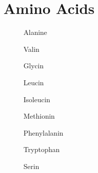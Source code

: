 \chapter{Amino Acids}
\label{sec:appA}

\begin{figure}[ht]
\centering
\begin{minipage}[b]{0.29\linewidth}
\centering
\alanine
\caption{Alanine}
\end{minipage}
\hspace{0.5cm}
\begin{minipage}[b]{0.29\linewidth}
\centering
\valin
\caption{Valin}
\end{minipage}
\hspace{0.5cm}
\begin{minipage}[b]{0.29\linewidth}
\centering
\glycin
\caption{Glycin}
\end{minipage}
\end{figure}


\begin{figure}[ht]
\centering
\begin{minipage}[b]{0.29\linewidth}
\centering
\leucin
\caption{Leucin}
\end{minipage}
\hspace{0.5cm}
\begin{minipage}[b]{0.29\linewidth}
\centering
\isoleucin
\caption{Isoleucin}
\end{minipage}
\hspace{0.5cm}
\begin{minipage}[b]{0.29\linewidth}
\centering
\methionin
\caption{Methionin}
\end{minipage}
\end{figure}

\begin{figure}[ht]
\centering
\begin{minipage}[b]{0.29\linewidth}
\centering
\phenylalanin
\caption{Phenylalanin}
\end{minipage}
\hspace{0.5cm}
\begin{minipage}[b]{0.29\linewidth}
\centering
\tryptophan
\caption{Tryptophan}
\end{minipage}
\hspace{0.5cm}
\begin{minipage}[b]{0.29\linewidth}
\centering
\serin
\caption{Serin}
\end{minipage}
\end{figure}


